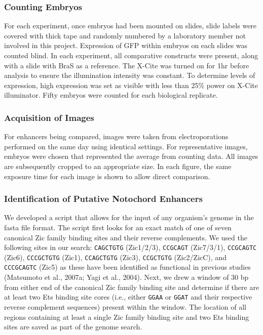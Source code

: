 \subsubsection{Counting Embryos}
For each experiment, once embryos had been mounted on slides, slide labels were covered with thick tape and randomly numbered by a laboratory member not involved in this project. Expression of GFP within embryos on each slides was counted blind. In each experiment, all comparative constructs were present, along with a slide with BraS as a reference. The X-Cite was turned on for 1hr before analysis to ensure the illumination intensity was constant. To determine levels of expression, high expression was set as visible with less than 25\% power on X-Cite illuminator. Fifty embryos were counted for each biological replicate.

\subsubsection{Acquisition of Images}
For enhancers being compared, images were taken from electroporations performed on the same day using identical settings. For representative images, embryos were chosen that represented the average from counting data. All images are subsequently cropped to an appropriate size. In each figure, the same exposure time for each image is shown to allow direct comparison.

\subsubsection{Identification of Putative Notochord Enhancers}
We developed a script that allows for the input of any organism’s genome in the fasta file format. The script first looks for an exact match of one of seven canonical Zic family binding sites and their reverse complements. We used the following sites in our search: \verb|CAGCTGTG| (Zic1/2/3), \verb|CCGCAGT| (Zic7/3/1), \verb|CCGCAGTC| (Zic6), \verb|CCCGCTGTG| (Zic1), \verb|CCAGCTGTG| (Zic3), \verb|CCGCTGTG| (Zic2/ZicC), and \verb|CCCGCAGTC| (Zic5) as these have been identified as functional in previous studies (Matsumoto et al., 2007a; Yagi et al., 2004). Next, we drew a window of 30 bp from either end of the canonical Zic family binding site and determine if there are at least two Ets binding site cores (i.e., either \verb|GGAA| or \verb|GGAT| and their respective reverse complement sequences) present within the window. The location of all regions containing at least a single Zic family binding site and two Ets binding sites are saved as part of the genome search.


